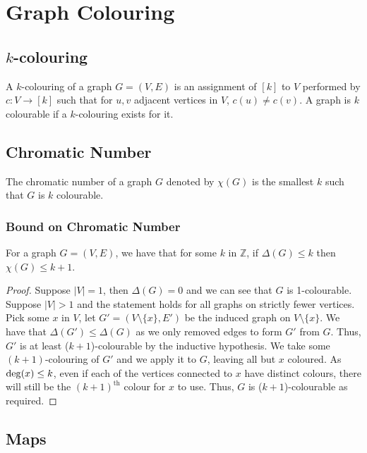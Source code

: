 \section{Graph Colouring}

\subsection{$k$-colouring}

A $k$-colouring of a graph $G = (V, E)$ is an assignment of $[k]$ to $V$ 
performed by $c : V \to [k]$ such that for $u, v$ adjacent vertices in $V$, 
$c(u) \neq c(v)$. A graph is $k$ colourable if a $k$-colouring exists for it.

\subsection{Chromatic Number}

The chromatic number of a graph $G$ denoted by $\chi(G)$ is the smallest 
$k$ such that $G$ is $k$ colourable.

\subsubsection{Bound on Chromatic Number}

For a graph $G = (V, E)$, we have that for some $k$ in $\mathbb{Z}$, if $\Delta(G) \leq k$
then $\chi(G) \leq k + 1$.
\begin{proof}
    Suppose $|V| = 1$, then $\Delta(G) = 0$ and we can see that $G$ is 1-colourable.
    Suppose $|V| > 1$ and the statement holds for all graphs on strictly fewer vertices.
    Pick some $x$ in $V$, let $G' = (V \setminus \{x\}, E')$ be the induced graph
    on $V \setminus \{x\}$. We have that $\Delta(G') \leq \Delta(G)$ as we only
    removed edges to form $G'$ from $G$. 
    Thus, $G'$ is at least ($k + 1$)-colourable by the inductive hypothesis. 
    We take some $(k + 1)$-colouring of $G'$ and we apply it to $G$, leaving all but 
    $x$ coloured.
    As $\operatorname{deg}(x) \leq k$, even if each of the vertices connected to $x$ have distinct
    colours, there will still be the $(k + 1)^\text{th}$ colour for $x$ to use.
    Thus, $G$ is ($k + 1$)-colourable as required.
\end{proof}

\subsection{Maps}


